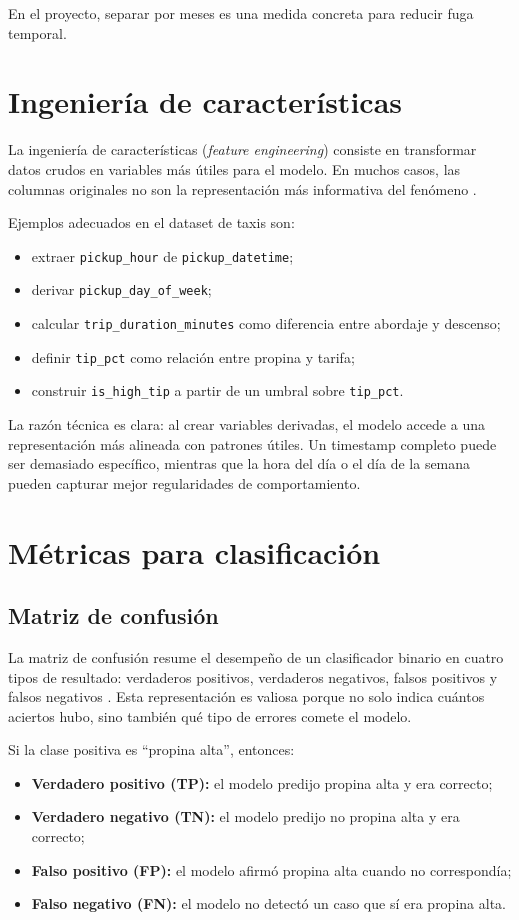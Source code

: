 \documentclass[12pt]{article}
\begin{document}
En el proyecto, separar por meses es una medida concreta para reducir fuga temporal.

\section{Ingeniería de características}
La ingeniería de características (\textit{feature engineering}) consiste en transformar datos crudos en variables más útiles para el modelo. En muchos casos, las columnas originales no son la representación más informativa del fenómeno \cite{gcp_create_glm}.

Ejemplos adecuados en el dataset de taxis son:
\begin{itemize}[leftmargin=*]
\item extraer \texttt{pickup\_hour} de \texttt{pickup\_datetime};
\item derivar \texttt{pickup\_day\_of\_week};
\item calcular \texttt{trip\_duration\_minutes} como diferencia entre abordaje y descenso;
\item definir \texttt{tip\_pct} como relación entre propina y tarifa;
\item construir \texttt{is\_high\_tip} a partir de un umbral sobre \texttt{tip\_pct}.
\end{itemize}

La razón técnica es clara: al crear variables derivadas, el modelo accede a una representación más alineada con patrones útiles. Un timestamp completo puede ser demasiado específico, mientras que la hora del día o el día de la semana pueden capturar mejor regularidades de comportamiento.

\section{Métricas para clasificación}
\subsection{Matriz de confusión}
La matriz de confusión resume el desempeño de un clasificador binario en cuatro tipos de resultado: verdaderos positivos, verdaderos negativos, falsos positivos y falsos negativos \cite{gcp_confusion_matrix,google_thresholding}. Esta representación es valiosa porque no solo indica cuántos aciertos hubo, sino también qué tipo de errores comete el modelo.

Si la clase positiva es ``propina alta'', entonces:
\begin{itemize}[leftmargin=*]
\item \textbf{Verdadero positivo (TP):} el modelo predijo propina alta y era correcto;
\item \textbf{Verdadero negativo (TN):} el modelo predijo no propina alta y era correcto;
\item \textbf{Falso positivo (FP):} el modelo afirmó propina alta cuando no correspondía;
\item \textbf{Falso negativo (FN):} el modelo no detectó un caso que sí era propina alta.
\end{itemize}
\end{document}

